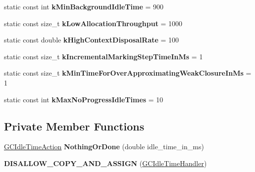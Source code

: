 \begin{DoxyCompactItemize}
\item 
static const int {\bfseries k\+Min\+Background\+Idle\+Time} = 900\hypertarget{classv8_1_1internal_1_1_g_c_idle_time_handler_abdc12dafbcc66a3a57efa094daca06d2}{}\label{classv8_1_1internal_1_1_g_c_idle_time_handler_abdc12dafbcc66a3a57efa094daca06d2}

\item 
static const size\+\_\+t {\bfseries k\+Low\+Allocation\+Throughput} = 1000\hypertarget{classv8_1_1internal_1_1_g_c_idle_time_handler_ae25eb6e8a6a10ee5097ffff5671d3466}{}\label{classv8_1_1internal_1_1_g_c_idle_time_handler_ae25eb6e8a6a10ee5097ffff5671d3466}

\item 
static const double {\bfseries k\+High\+Context\+Disposal\+Rate} = 100\hypertarget{classv8_1_1internal_1_1_g_c_idle_time_handler_aefba3e232d4ec9128c842b2a8a4a5d79}{}\label{classv8_1_1internal_1_1_g_c_idle_time_handler_aefba3e232d4ec9128c842b2a8a4a5d79}

\item 
static const size\+\_\+t {\bfseries k\+Incremental\+Marking\+Step\+Time\+In\+Ms} = 1\hypertarget{classv8_1_1internal_1_1_g_c_idle_time_handler_a1ef856d1b7e95aea63f0d8e7d46103a3}{}\label{classv8_1_1internal_1_1_g_c_idle_time_handler_a1ef856d1b7e95aea63f0d8e7d46103a3}

\item 
static const size\+\_\+t {\bfseries k\+Min\+Time\+For\+Over\+Approximating\+Weak\+Closure\+In\+Ms} = 1\hypertarget{classv8_1_1internal_1_1_g_c_idle_time_handler_a859f061e71f359aee16b3184f000ac02}{}\label{classv8_1_1internal_1_1_g_c_idle_time_handler_a859f061e71f359aee16b3184f000ac02}

\item 
static const int {\bfseries k\+Max\+No\+Progress\+Idle\+Times} = 10\hypertarget{classv8_1_1internal_1_1_g_c_idle_time_handler_aa1b3ce52d5e1bb25dbf76107cb5a7e12}{}\label{classv8_1_1internal_1_1_g_c_idle_time_handler_aa1b3ce52d5e1bb25dbf76107cb5a7e12}

\end{DoxyCompactItemize}
\subsection*{Private Member Functions}
\begin{DoxyCompactItemize}
\item 
\hyperlink{classv8_1_1internal_1_1_g_c_idle_time_action}{G\+C\+Idle\+Time\+Action} {\bfseries Nothing\+Or\+Done} (double idle\+\_\+time\+\_\+in\+\_\+ms)\hypertarget{classv8_1_1internal_1_1_g_c_idle_time_handler_a55a3a4997c8f39172d03cece7d37120d}{}\label{classv8_1_1internal_1_1_g_c_idle_time_handler_a55a3a4997c8f39172d03cece7d37120d}

\item 
{\bfseries D\+I\+S\+A\+L\+L\+O\+W\+\_\+\+C\+O\+P\+Y\+\_\+\+A\+N\+D\+\_\+\+A\+S\+S\+I\+GN} (\hyperlink{classv8_1_1internal_1_1_g_c_idle_time_handler}{G\+C\+Idle\+Time\+Handler})\hypertarget{classv8_1_1internal_1_1_g_c_idle_time_handler_aa8ced2494e534dcb11202ecee09c0345}{}\label{classv8_1_1internal_1_1_g_c_idle_time_handler_aa8ced2494e534dcb11202ecee09c0345}

\end{DoxyCompactItemize}
